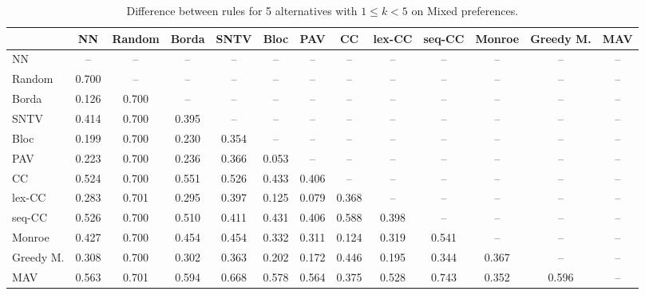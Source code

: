 
\begin{table*}[htbp]
\centering
\begin{tabular}{lcccccccccccc}
\toprule
 & NN & Random & Borda & SNTV & Bloc & PAV & CC & lex-CC & seq-CC & Monroe & Greedy M. & MAV \\
\midrule
NN & -- & -- & -- & -- & -- & -- & -- & -- & -- & -- & -- & -- \\
Random & \cellcolor{blue!70} 0.700 & -- & -- & -- & -- & -- & -- & -- & -- & -- & -- & -- \\
Borda & \cellcolor{blue!12} 0.126 & \cellcolor{blue!70} 0.700 & -- & -- & -- & -- & -- & -- & -- & -- & -- & -- \\
SNTV & \cellcolor{blue!41} 0.414 & \cellcolor{blue!70} 0.700 & \cellcolor{blue!39} 0.395 & -- & -- & -- & -- & -- & -- & -- & -- & -- \\
Bloc & \cellcolor{blue!19} 0.199 & \cellcolor{blue!70} 0.700 & \cellcolor{blue!23} 0.230 & \cellcolor{blue!35} 0.354 & -- & -- & -- & -- & -- & -- & -- & -- \\
PAV & \cellcolor{blue!22} 0.223 & \cellcolor{blue!70} 0.700 & \cellcolor{blue!23} 0.236 & \cellcolor{blue!36} 0.366 & \cellcolor{blue!5} 0.053 & -- & -- & -- & -- & -- & -- & -- \\
CC & \cellcolor{blue!52} 0.524 & \cellcolor{blue!70} 0.700 & \cellcolor{blue!55} 0.551 & \cellcolor{blue!52} 0.526 & \cellcolor{blue!43} 0.433 & \cellcolor{blue!40} 0.406 & -- & -- & -- & -- & -- & -- \\
lex-CC & \cellcolor{blue!28} 0.283 & \cellcolor{blue!70} 0.701 & \cellcolor{blue!29} 0.295 & \cellcolor{blue!39} 0.397 & \cellcolor{blue!12} 0.125 & \cellcolor{blue!7} 0.079 & \cellcolor{blue!36} 0.368 & -- & -- & -- & -- & -- \\
seq-CC & \cellcolor{blue!52} 0.526 & \cellcolor{blue!70} 0.700 & \cellcolor{blue!51} 0.510 & \cellcolor{blue!41} 0.411 & \cellcolor{blue!43} 0.431 & \cellcolor{blue!40} 0.406 & \cellcolor{blue!58} 0.588 & \cellcolor{blue!39} 0.398 & -- & -- & -- & -- \\
Monroe & \cellcolor{blue!42} 0.427 & \cellcolor{blue!70} 0.700 & \cellcolor{blue!45} 0.454 & \cellcolor{blue!45} 0.454 & \cellcolor{blue!33} 0.332 & \cellcolor{blue!31} 0.311 & \cellcolor{blue!12} 0.124 & \cellcolor{blue!31} 0.319 & \cellcolor{blue!54} 0.541 & -- & -- & -- \\
Greedy M. & \cellcolor{blue!30} 0.308 & \cellcolor{blue!70} 0.700 & \cellcolor{blue!30} 0.302 & \cellcolor{blue!36} 0.363 & \cellcolor{blue!20} 0.202 & \cellcolor{blue!17} 0.172 & \cellcolor{blue!44} 0.446 & \cellcolor{blue!19} 0.195 & \cellcolor{blue!34} 0.344 & \cellcolor{blue!36} 0.367 & -- & -- \\
MAV & \cellcolor{blue!56} 0.563 & \cellcolor{blue!70} 0.701 & \cellcolor{blue!59} 0.594 & \cellcolor{blue!66} 0.668 & \cellcolor{blue!57} 0.578 & \cellcolor{blue!56} 0.564 & \cellcolor{blue!37} 0.375 & \cellcolor{blue!52} 0.528 & \cellcolor{blue!74} 0.743 & \cellcolor{blue!35} 0.352 & \cellcolor{blue!59} 0.596 & -- \\
\bottomrule
\end{tabular}

\caption{Difference between rules for 5 alternatives with $1 \leq k < 5$ on Mixed preferences.}
\label{tab:rule_distance_heatmap-m=[5]-pref_dist=mixed}
\end{table*}
    
